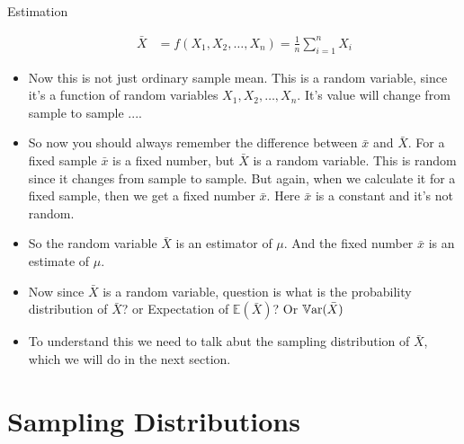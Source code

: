 \documentclass[8pt, usepdftitle=false]{beamer}
\begin{document}
\begin{frame}[allowframebreaks]{Estimation}
\begin{itemize}
  \begin{align*}
    \bar{X} &= f(X_1, X_2, \ldots, X_n) = \frac{1}{n}\sum_{i = 1}^{n} X_i
  \end{align*}

  \item Now this is not just ordinary sample mean. This is a random variable, since it's a function of random variables $X_1, X_2, \ldots, X_n$. It's value will change from sample to sample ....


  \item So now you should always remember the difference between $\bar{x}$ and $\bar{X}$. For a fixed sample $\bar{x}$ is a fixed number, but $\bar{X}$ is a random variable. This is random since it changes from sample to sample. But again, when we calculate it for a fixed sample, then we get a fixed number $\bar{x}$. Here $\bar{x}$ is a constant and it's not random.

  \item So the random variable $\bar{X}$ is an estimator of $\mu$. And the fixed number $\bar{x}$ is an estimate of $\mu$.



  \item  Now since $ \bar{X}$ is a random variable, question is what is the probability distribution of $\bar{X} $? or Expectation of $\mathbb{E}(\bar{X})$? Or $\mathbb{V}\mathrm{ar}{(}\bar{X})$

\item To understand this we need to talk abut the sampling distribution of $\bar{X}$, which we will do in the next section.


 
\end{itemize}

\end{frame}


\section{Sampling Distributions}
\frame{\sectionpage}


\end{document}
